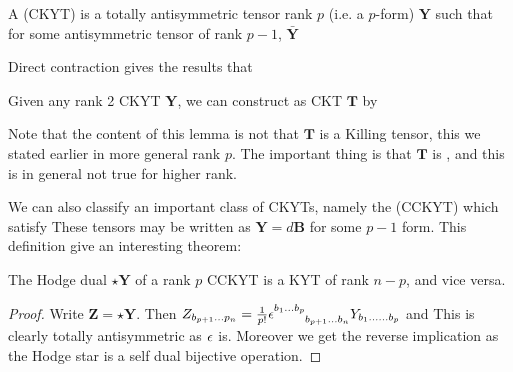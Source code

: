 \documentclass{article}
\begin{document}
\begin{definition}
A  (CKYT) is a totally antisymmetric tensor rank $p$ (i.e. a $p$-form)  $\bm{Y}$ such that 
for some antisymmetric tensor of rank $p-1$, $\bar{\bm{Y}}$
\end{definition}
Direct contraction gives the results that 
\begin{lemma}
Given any rank 2 CKYT $\bm{Y}$, we can construct as CKT $\bm{T}$ by 
\end{lemma}
\begin{remark}
Note that the content of this lemma is not that $\bm{T}$ is a Killing tensor, this we stated earlier in more general rank $p$. The important thing is that $\bm{T}$ is , and this is in general not true for higher rank. 
\end{remark}

We can also classify an important class of CKYTs, namely the  (CCKYT) which satisfy 
These tensors may be written as $\bm{Y} = d\bm{B}$ for some $p-1$ form. This definition give an interesting theorem:

\begin{theorem}
The Hodge dual $\star\bm{Y}$ of a rank $p$ CCKYT is a KYT of rank $n-p$, and vice versa. 
\end{theorem}
\begin{proof}
Write $\bm{Z} = \star \bm{Y}$. Then $Z_{b_{p+1} \dots p_n} = \frac{1}{p!} \eps\indices{^{b_1}^\dots^{b_p}_{b_{p+1}}_\dots_{b_n}}Y_{b_1 \dots \dots b_p}$ and 
This is clearly totally antisymmetric as $\epsilon$ is. Moreover we get the reverse implication as the Hodge star is a self dual bijective operation. 
\end{proof}
\end{document}
